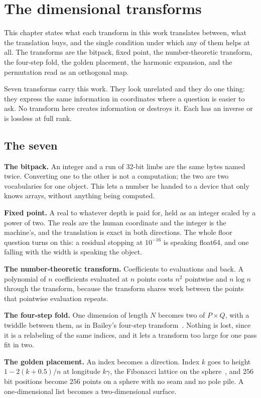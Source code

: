 \chapter{The dimensional transforms}

This chapter states what each transform in this work translates between, what the translation buys, and the single condition under which any of them helps at all. The transforms are the bitpack, fixed point, the number-theoretic transform, the four-step fold, the golden placement, the harmonic expansion, and the permutation read as an orthogonal map.

Seven transforms carry this work. They look unrelated and they do one thing: they express the same information in coordinates where a question is easier to ask. No transform here creates information or destroys it. Each has an inverse or is lossless at full rank.

\section{The seven}

\textbf{The bitpack.} An integer and a run of 32-bit limbs are the same bytes named twice. Converting one to the other is not a computation; the two are two vocabularies for one object. This lets a number be handed to a device that only knows arrays, without anything being computed.

\textbf{Fixed point.} A real to whatever depth is paid for, held as an integer scaled by a power of two. The reals are the human coordinate and the integer is the machine's, and the translation is exact in both directions. The whole floor question turns on this: a residual stopping at \(10^{-16}\) is speaking float64, and one falling with the width is speaking the object.

\textbf{The number-theoretic transform.} Coefficients to evaluations and back. A polynomial of \(n\) coefficients evaluated at \(n\) points costs \(n^2\) pointwise and \(n \log n\) through the transform, because the transform shares work between the points that pointwise evaluation repeats.

\textbf{The four-step fold.} One dimension of length \(N\) becomes two of \(P \times Q\), with a twiddle between them, as in Bailey's four-step transform~\cite{src:Bailey-1990}. Nothing is lost, since it is a relabeling of the same indices, and it lets a transform too large for one pass fit in two.

\textbf{The golden placement.} An index becomes a direction. Index \(k\) goes to height \(1 - 2(k + 0.5)/n\) at longitude \(k\gamma\), the Fibonacci lattice on the sphere~\cite{src:Gonzalez-2010}, and \(256\) bit positions become \(256\) points on a sphere with no seam and no pole pile. A one-dimensional list becomes a two-dimensional surface.

